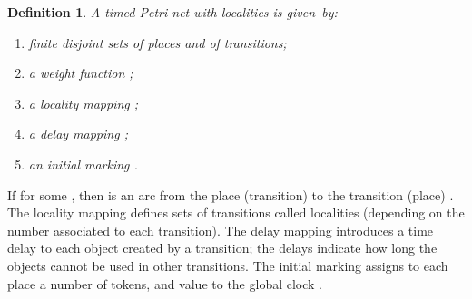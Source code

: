 \documentclass{eptcs}
\newtheorem{definition}{Definition}
\begin{document}
\begin{definition} A timed Petri net with localities
 is given~by:
\begin{enumerate}
\item[] finite disjoint sets  of places and  of
transitions;
\item[] a weight function ;
\item[] a locality mapping ;
\item[] a delay mapping ;
\item[] an initial marking .
\end{enumerate}
\end{definition}
\noindent If  for some , then  is an arc from the place (transition) 
to the transition (place) . The locality mapping  defines sets
of transitions called localities (depending on the number associated
to each transition). The delay mapping  introduces a time delay to
each object created by a transition; the delays indicate how long
the objects cannot be used in other transitions. The initial marking
 assigns to each place a number of tokens, and value  to the
global clock .
\end{document}
